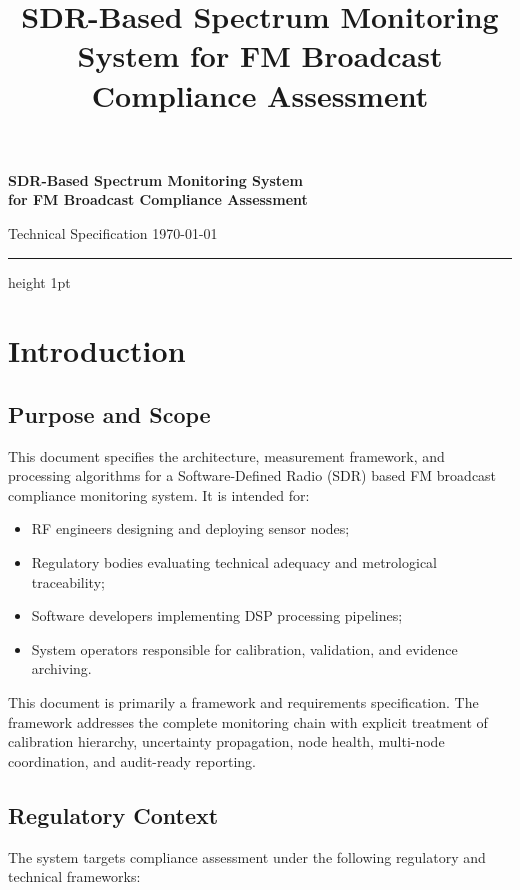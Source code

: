\documentclass[11pt]{article}
\title{SDR-Based Spectrum Monitoring System for FM Broadcast \\ Compliance Assessment}
\author{}
\date{}
\begin{document}
\begin{center}
    {\LARGE\bfseries SDR-Based Spectrum Monitoring System \\ for FM Broadcast Compliance Assessment\par}
    \vspace{0.6em}
    {\large Technical Specification \textendash{} \today\par}
\end{center}
\vspace{0.5em}
{\color{accent}\hrule height 1pt}
\vspace{0.8em}
\tableofcontents

\section*{Introduction}

\subsection*{Purpose and Scope}

This document specifies the architecture, measurement framework, and processing algorithms for a Software-Defined Radio (SDR) based FM broadcast compliance monitoring system. It is intended for:

\begin{itemize}
    \item RF engineers designing and deploying sensor nodes;
    \item Regulatory bodies evaluating technical adequacy and metrological traceability;
    \item Software developers implementing DSP processing pipelines;
    \item System operators responsible for calibration, validation, and evidence archiving.
\end{itemize}

This document is primarily a framework and requirements specification. The framework addresses the complete monitoring chain with explicit treatment of calibration hierarchy, uncertainty propagation, node health, multi-node coordination, and audit-ready reporting.

\subsection*{Regulatory Context}

The system targets compliance assessment under the following regulatory and technical frameworks:
\end{document}
